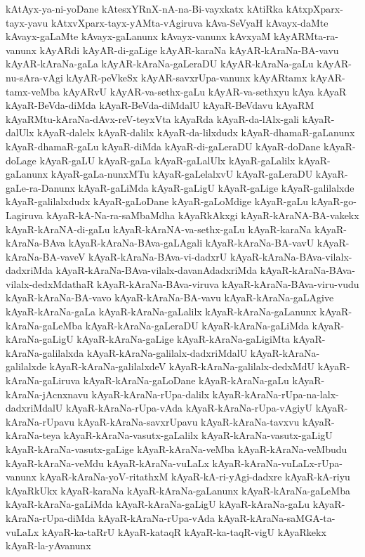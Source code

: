 {kAtAyx-ya-ni-yoDane
kAtesxYRnX-nA-na-Bi-vayxkatx
kAtiRka
kAtxpXparx-tayx-yavu
kAtxvXparx-tayx-yAMta-vAgiruva
kAva-SeVyaH
kAvayx-daMte
kAvayx-gaLaMte
kAvayx-gaLanunx
kAvayx-vanunx
kAvxyaM
kAyARMta-ra-vanunx
kAyARdi
kAyAR-di-gaLige
kAyAR-karaNa
kAyAR-kAraNa-BA-vavu
kAyAR-kAraNa-gaLa
kAyAR-kAraNa-gaLeraDU
kAyAR-kAraNa-gaLu
kAyAR-nu-sAra-vAgi
kAyAR-peVkeSx
kAyAR-savxrUpa-vanunx
kAyARtamx
kAyAR-tamx-veMba
kAyARvU
kAyAR-va-sethx-gaLu
kAyAR-va-sethxyu
kAya
kAyaR
kAyaR-BeVda-diMda
kAyaR-BeVda-diMdalU
kAyaR-BeVdavu
kAyaRM
kAyaRMtu-kAraNa-dAvx-reV-teyxVta
kAyaRda
kAyaR-da-lAlx-gali
kAyaR-dalUlx
kAyaR-dalelx
kAyaR-dalilx
kAyaR-da-lilxdudx
kAyaR-dhamaR-gaLanunx
kAyaR-dhamaR-gaLu
kAyaR-diMda
kAyaR-di-gaLeraDU
kAyaR-doDane
kAyaR-doLage
kAyaR-gaLU
kAyaR-gaLa
kAyaR-gaLalUlx
kAyaR-gaLalilx
kAyaR-gaLanunx
kAyaR-gaLa-nunxMTu
kAyaR-gaLelalxvU
kAyaR-gaLeraDU
kAyaR-gaLe-ra-Danunx
kAyaR-gaLiMda
kAyaR-gaLigU
kAyaR-gaLige
kAyaR-galilalxde
kAyaR-galilalxdudx
kAyaR-gaLoDane
kAyaR-gaLoMdige
kAyaR-gaLu
kAyaR-go-Lagiruva
kAyaR-kA-Na-ra-saMbaMdha
kAyaRkAkxgi
kAyaR-kAraNA-BA-vakekx
kAyaR-kAraNA-di-gaLu
kAyaR-kAraNA-va-sethx-gaLu
kAyaR-karaNa
kAyaR-kAraNa-BAva
kAyaR-kAraNa-BAva-gaLAgali
kAyaR-kAraNa-BA-vavU
kAyaR-kAraNa-BA-vaveV
kAyaR-kAraNa-BAva-vi-dadxrU
kAyaR-kAraNa-BAva-vilalx-dadxriMda
kAyaR-kAraNa-BAva-vilalx-davanAdadxriMda
kAyaR-kAraNa-BAva-vilalx-dedxMdathaR
kAyaR-kAraNa-BAva-viruva
kAyaR-kAraNa-BAva-viru-vudu
kAyaR-kAraNa-BA-vavo
kAyaR-kAraNa-BA-vavu
kAyaR-kAraNa-gaLAgive
kAyaR-kAraNa-gaLa
kAyaR-kAraNa-gaLalilx
kAyaR-kAraNa-gaLanunx
kAyaR-kAraNa-gaLeMba
kAyaR-kAraNa-gaLeraDU
kAyaR-kAraNa-gaLiMda
kAyaR-kAraNa-gaLigU
kAyaR-kAraNa-gaLige
kAyaR-kAraNa-gaLigiMta
kAyaR-kAraNa-galilalxda
kAyaR-kAraNa-galilalx-dadxriMdalU
kAyaR-kAraNa-galilalxde
kAyaR-kAraNa-galilalxdeV
kAyaR-kAraNa-galilalx-dedxMdU
kAyaR-kAraNa-gaLiruva
kAyaR-kAraNa-gaLoDane
kAyaR-kAraNa-gaLu
kAyaR-kAraNa-jAcnxnavu
kAyaR-kAraNa-rUpa-dalilx
kAyaR-kAraNa-rUpa-na-lalx-dadxriMdalU
kAyaR-kAraNa-rUpa-vAda
kAyaR-kAraNa-rUpa-vAgiyU
kAyaR-kAraNa-rUpavu
kAyaR-kAraNa-savxrUpavu
kAyaR-kAraNa-tavxvu
kAyaR-kAraNa-teya
kAyaR-kAraNa-vasutx-gaLalilx
kAyaR-kAraNa-vasutx-gaLigU
kAyaR-kAraNa-vasutx-gaLige
kAyaR-kAraNa-veMba
kAyaR-kAraNa-veMbudu
kAyaR-kAraNa-veMdu
kAyaR-kAraNa-vuLaLx
kAyaR-kAraNa-vuLaLx-rUpa-vanunx
kAyaR-kAraNa-yoV-ritathxM
kAyaR-kA-ri-yAgi-dadxre
kAyaR-kA-riyu
kAyaRkUkx
kAyaR-karaNa
kAyaR-kAraNa-gaLanunx
kAyaR-kAraNa-gaLeMba
kAyaR-kAraNa-gaLiMda
kAyaR-kAraNa-gaLigU
kAyaR-kAraNa-gaLu
kAyaR-kAraNa-rUpa-diMda
kAyaR-kAraNa-rUpa-vAda
kAyaR-kAraNa-saMGA-ta-vuLaLx
kAyaR-ka-taRrU
kAyaR-kataqR
kAyaR-ka-taqR-vigU
kAyaRkekx
kAyaR-la-yAvanunx
}
